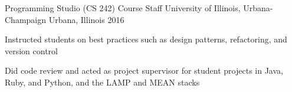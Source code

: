 \begin{cventries}
{\begin{cvitems}
      \end{cvitems}
    }
    \cventry
    {Programming Studio (CS 242) Course Staff}
    {University of Illinois, Urbana-Champaign}
    {Urbana, Illinois}
    {2016}
    {
      \begin{cvitems}
        \item {Instructed students on best practices such as design patterns, refactoring, and version control}
        \item {Did code review and acted as project supervisor for student projects in Java, Ruby, and Python, and the LAMP and MEAN stacks}
      \end{cvitems}
    }

\end{cventries}
